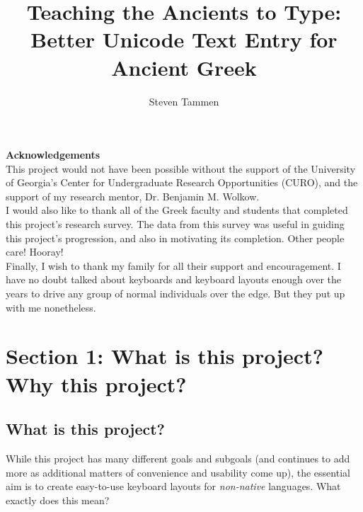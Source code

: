 \documentclass[11pt]{article}
\author{Steven Tammen}
\date{}
\title{Teaching the Ancients to Type: Better Unicode Text Entry for Ancient Greek}
\begin{document}
\maketitle
\setcounter{tocdepth}{2}
\tableofcontents

\bigskip
\bigskip
\noindent \textbf{Acknowledgements} \\

This project would not have been possible without the support of the University of Georgia's Center for Undergraduate Research Opportunities (CURO), and the support of my research mentor, Dr. Benjamin M. Wolkow. \\

I would also like to thank all of the Greek faculty and students that completed this project's research survey. The data from this survey was useful in guiding this project's progression, and also in motivating its completion. Other people care! Hooray! \\

Finally, I wish to thank my family for all their support and encouragement. I have no doubt talked about keyboards and keyboard layouts enough over the years to drive any group of normal individuals over the edge. But they put up with me nonetheless.

\newpage

\section{Section 1: What is this project? Why this project?}
\label{sec:org555e2e9}

\subsection{What is this project?}
\label{sec:org974d1a5}

While this project has many different goals and subgoals (and continues to add more as additional matters of convenience and usability come up), the essential aim is to create easy-to-use keyboard layouts for \emph{non-native} languages. What exactly does this mean?
\end{document}
